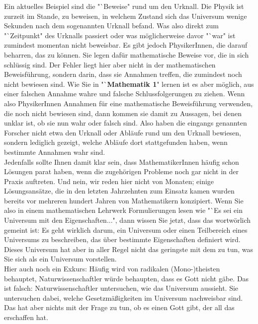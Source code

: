 Ein aktuelles Beispiel sind die "`Beweise" rund um den Urknall. Die Physik ist zurzeit im Stande, zu beweisen, in welchem Zustand sich das Universum wenige Sekunden nach dem sogenannten Urknall befand. Was also direkt zum "`Zeitpunkt" des Urknalls passiert oder was möglicherweise davor "`war" ist zumindest momentan nicht beweisbar. Es gibt jedoch PhysikerInnen, die darauf beharren, das zu können. Sie legen dafür mathematische Beweise vor, die in sich schlüssig sind. Der Fehler liegt hier aber nicht in der mathematischen Beweisführung, sondern darin, dass sie Annahmen treffen, die zumindest noch nicht bewiesen sind. Wie Sie in "`\textbf{Mathematik 1}" lernen ist es aber möglich, aus einer falschen Annahme wahre und falsche Schlussfolgerungen zu ziehen. Wenn also PhysikerInnen Annahmen für eine mathematische Beweisführung verwenden, die noch nicht bewiesen sind, dann kommen sie damit zu Aussagen, bei denen unklar ist, ob sie nun wahr oder falsch sind. Also haben die eingangs genannten Forscher nicht etwa den Urknall oder Abläufe rund um den Urknall bewiesen, sondern lediglich gezeigt, welche Abläufe dort stattgefunden haben, wenn bestimmte Annahmen wahr sind.\\

Jedenfalls sollte Ihnen damit klar sein, dass MathematikerInnen häufig schon Lösungen parat haben, wenn die zugehörigen Probleme noch gar nicht in der Praxis auftreten. Und nein, wir reden hier nicht von Monaten; einige Lösungsansätze, die in den letzten Jahrzehnten zum Einsatz kamen wurden bereits vor mehreren hundert Jahren von Mathematikern konzipiert. Wenn Sie also in einem mathematischen Lehrwerk Formulierungen lesen wie "`Es sei ein Universum mit den Eigenschaften...", dann wissen Sie jetzt, dass das wortwörlich gemeint ist: Es geht wirklich darum, ein Universum oder einen Teilbereich eines Universums zu beschreiben, das über bestimmte Eigenschaften definiert wird. Dieses Universum hat aber in aller Regel nicht das geringste mit dem zu tun, was Sie sich als ein Universum vorstellen.\\

Hier auch noch ein Exkurs: Häufig wird von radikalen (Mono-)theisten behauptet, Naturwissenschaftler würde behaupten, dass es Gott nicht gäbe. Das ist falsch: Naturwissenschaftler untersuchen, wie das Universum aussieht. Sie untersuchen dabei, welche Gesetzmäßigkeiten im Universum nachweisbar sind. Das hat aber nichts mit der Frage zu tun, ob es einen Gott gibt, der all das erschaffen hat.\\


